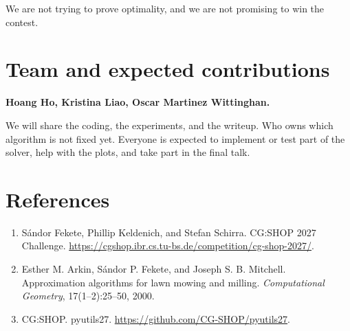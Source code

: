 \documentclass[11pt]{article}
\begin{document}
We are not trying to prove optimality, and we are not promising to win
the contest.

\section{Team and expected contributions}

\textbf{Hoang Ho, Kristina Liao, Oscar Martinez Wittinghan.}

We will share the coding, the experiments, and the writeup.
Who owns which algorithm is not fixed yet.
Everyone is expected to implement or test part of the solver, help
with the plots, and take part in the final talk.

\section{References}

\begin{enumerate}
\item S\'{a}ndor Fekete, Phillip Keldenich, and Stefan Schirra.
CG:SHOP 2027 Challenge.
\url{https://cgshop.ibr.cs.tu-bs.de/competition/cg-shop-2027/}.

\item Esther M. Arkin, S\'{a}ndor P. Fekete, and Joseph S. B. Mitchell.
Approximation algorithms for lawn mowing and milling.
{\em Computational Geometry}, 17(1--2):25--50, 2000.

\item CG:SHOP.
pyutils27.
\url{https://github.com/CG-SHOP/pyutils27}.
\end{enumerate}
\end{document}
